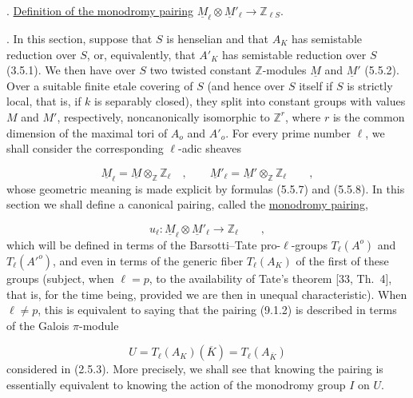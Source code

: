 
\medskip
{}. \underline{Definition of the monodromy pairing}
$\underline{M}_{\ell}\otimes\underline{M}'_{\ell}
 \longrightarrow \mathbb{Z}_{\ell S}$.

\medskip
{}. In this section, suppose that $S$ is henselian and that $A_K$
has semistable reduction over $S$, or, equivalently, that $A'_K$
has semistable reduction over $S$ (3.5.1). We then have over $S$ two
twisted constant $\mathbb{Z}$-modules $\underline{M}$ and
$\underline{M}'$ (5.5.2). Over a suitable finite etale covering of
$S$ (and hence over $S$ itself if $S$ is strictly local, that is, if
$k$ is separably closed), they split into constant groups with
values $M$ and $M'$, respectively, noncanonically isomorphic to
$\mathbb{Z}^{r}$, where $r$ is the common dimension of the maximal
tori of $A_o$ and $A'_o$. For every prime number $\ell$, we shall
consider the corresponding $\ell$-adic sheaves

\begin{equation}\tag{9.1.1}
\underline{M}_{\ell}=\underline{M}\otimes_{\mathbb{Z}}\mathbb{Z}_{\ell}
 \quad , \qquad
\underline{M}'_{\ell}=\underline{M}'\otimes_{\mathbb{Z}}\mathbb{Z}_{\ell}
 \qquad ,
\end{equation}
whose geometric meaning is made explicit by formulas (5.5.7) and
(5.5.8). In this section we shall define a canonical pairing, called
the \underline{monodromy pairing},

\begin{equation}\tag{9.1.2}
u_{\ell}:\underline{M}_{\ell}\otimes\underline{M}'_{\ell}
 \longrightarrow\mathbb{Z}_{\ell} \qquad ,
\end{equation}
which will be defined in terms of the Barsotti--Tate pro-$\ell$-groups
$T_{\ell}(A^{o})$ and $T_{\ell}({A'}^{o})$, and even in terms of the
generic fiber $T_{\ell}(A_K)$ of the first of these groups (subject,
when $\ell=p$, to the availability of Tate's theorem [33, Th.~4],
that is, for the time being, provided we are then in unequal
characteristic). When $\ell\neq p$, this is equivalent to saying
that the pairing (9.1.2) is described in terms of the Galois
$\pi$-module

\begin{equation}\tag{9.1.3}
U=T_{\ell}(A_K)(\overline K)=T_{\ell}(A_{\overline K})
\end{equation}
considered in (2.5.3). More precisely, we shall see that knowing the
pairing is essentially equivalent to knowing the action of the
monodromy group $I$ on $U$.
